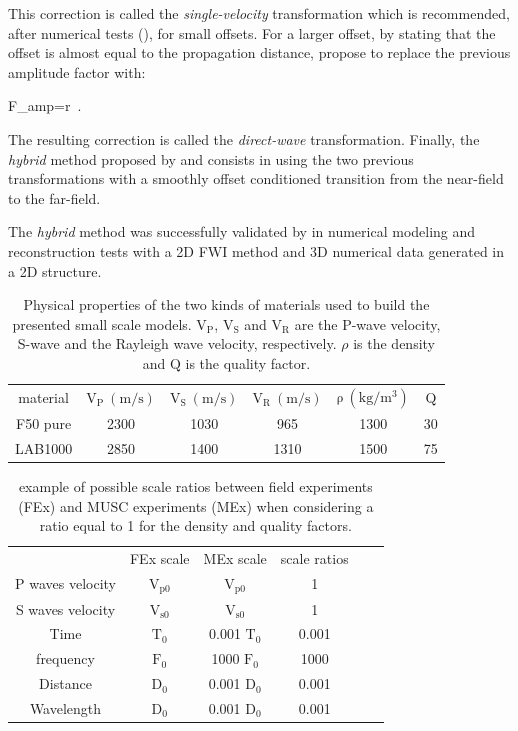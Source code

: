 \documentclass[extra,mreferee]{gji}
\begin{document}
This correction is called the \textit{single-velocity} transformation which is recommended, after numerical tests (\cite{Forbriger_LSS_2014, schafer2014lss}), for small offsets. For a larger offset, by stating that the offset is almost equal to the propagation distance, \cite{schafer2014lss} propose to replace the previous amplitude factor with:

\equation
\label{eq:direct-wave}
F_{amp}=r\ .
\endequation

The resulting correction is called the \textit{direct-wave} transformation. Finally, the \textit{hybrid} method proposed by \cite{Forbriger_LSS_2014} and \cite{schafer2014lss} consists in using the two previous transformations with a smoothly offset conditioned transition from the near-field to the far-field.

The \textit{hybrid} method was successfully validated by \cite{schafer2014lss} in numerical modeling and reconstruction tests with a 2D FWI method and 3D numerical data generated in a 2D structure.

\clearpage
\newpage

\begin{table}
\centering
\caption{Physical properties of the two kinds of materials used to build the presented small scale models. $\mathrm{V_{P}}$, $\mathrm{V_{S}}$ and $\mathrm{V_{R}}$ are the P-wave velocity, S-wave and the Rayleigh wave velocity, respectively. $\rho$ is the density and $\mathrm{Q}$ is the quality factor.}
\begin{tabular}{cccccc}
material & $\mathrm{V_{P}\ (m/s)}$ & $\mathrm{V_{S}\ (m/s)}$ & $\mathrm{V_{R}\ (m/s)}$ & $\mathrm{\rho\ (kg/m^{3})}$ & $\mathrm{Q}$ \\
F50 pure & 2300 & 1030 & 965 & 1300 & 30 \\
LAB1000 & 2850 & 1400 & 1310 & 1500 & 75 \\
\end{tabular}
\label{tab:epoxy-resin}
\end{table}

\clearpage
\newpage

\begin{table}
	\centering
	\caption{ example of possible scale ratios between field experiments (FEx) and MUSC experiments (MEx) when considering a ratio equal to 1 for the density and quality factors.}
	\begin{tabular}{cccccc}
		\quad & FEx scale & MEx scale & scale ratios \\
		P waves velocity & $\mathrm{V_{p 0}}$ & $\mathrm{V_{p 0}}$ & 1 \\
		S waves velocity & $\mathrm{V_{s 0}}$ & $\mathrm{V_{s 0}}$ & 1 \\
		Time & $\mathrm{T_{0}}$ & 0.001 $\mathrm{T_{0}}$ & 0.001 \\
		frequency & $\mathrm{F_{0}}$ & 1000 $\mathrm{F_{0}}$ & 1000 \\
		Distance & $\mathrm{D_{0}}$ & 0.001 $\mathrm{D_{0}}$ & 0.001 \\
		Wavelength & $\mathrm{D_{0}}$ & 0.001 $\mathrm{D_{0}}$ & 0.001 \\
	\end{tabular}
	\label{tab:scaling}
\end{table}
\end{document}
